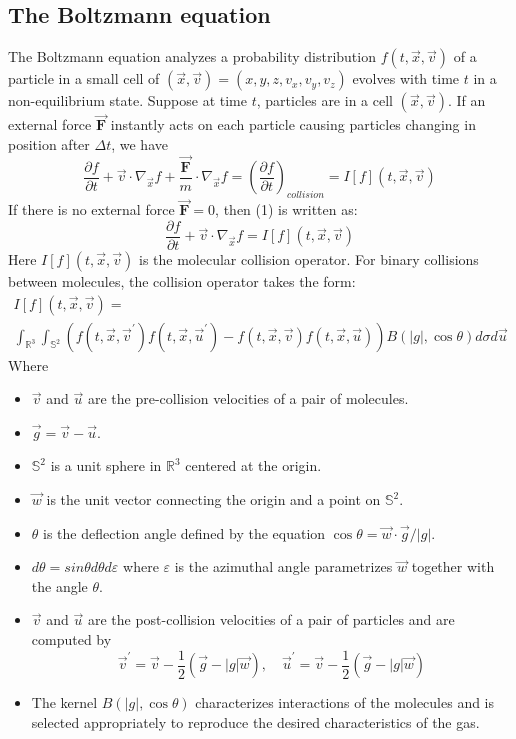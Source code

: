 \documentclass{article}
\begin{document}
\subsection{The Boltzmann equation} \label{BoltzEq}
The Boltzmann equation analyzes a probability distribution $f(t, \vec{x}, \vec{v})$ of a particle in a small cell of $(\vec{x}, \vec{v})=(x,y,z,v_x,v_y,v_z)$ evolves with time $t$ in a non-equilibrium state. Suppose at time $t$, particles are in a cell $(\vec{x},\vec{v})$. If an external force $\vec{\textbf{F}}$ instantly acts on each particle causing particles changing in position after $\Delta t$, we have 
\begin{equation} \label{BoltzEqGeneral}
\frac{\partial f}{\partial t} + \vec{v}\cdot\nabla_{\vec{x}}f + \frac{\vec{\textbf{F}}}{m}\cdot\nabla_{\vec{x}}f = \left(\frac{\partial f}{\partial t}\right)_{collision} = I[f](t,\vec{x},\vec{v})
\end{equation}
If there is no external force $\vec{\textbf{F}} = 0$, then (1) is written as:
\begin{equation} \label{BoltzEqNoForce}
\frac{\partial f}{\partial t} + \vec{v}\cdot\nabla_{\vec{x}}f = I[f](t,\vec{x},\vec{v})
\end{equation}
Here $I[f](t,\vec{x},\vec{v})$ is the molecular collision operator. For binary collisions between molecules, the collision operator takes the form:
\begin{multline} \label{CollOp}
I[f](t,\vec{x},\vec{v}) = \\ \int_{\mathbb{R}^3}\int_{\mathbb{S}^2}(f(t,\vec{x},\vec{v}^\prime)f(t,\vec{x},\vec{u}^\prime) - f(t,\vec{x},\vec{v})f(t,\vec{x},\vec{u}))B(|g|,\cos\theta)d\sigma d\vec{u}
\end{multline}
Where
\begin{itemize}
	\item $\vec{v}$ and $\vec{u}$ are the pre-collision velocities of a pair of molecules.
	\item $\vec{g} = \vec{v} - \vec{u}$.
	\item $\mathbb{S}^2$ is a unit sphere in $\mathbb{R}^3$ centered at the origin.
	\item $\vec{w}$ is the unit vector connecting the origin and a point on $\mathbb{S}^2$.
	\item $\theta$ is the deflection angle defined by the equation $\cos\theta = \vec{w}\cdot\vec{g}/|g|$.
	\item $d\theta = sin\theta d\theta d\varepsilon$ where $\varepsilon$ is the azimuthal angle parametrizes $\vec{w}$ together with the angle $\theta$.
	\item $\vec{v}$ and $\vec{u}$ are the post-collision velocities of a pair of particles and are computed by
	\begin{equation*}
		\vec{v}^\prime = \vec{v} - \frac{1}{2}(\vec{g} - |g|\vec{w}), \quad \vec{u}^\prime = \vec{v} - \frac{1}{2}(\vec{g} - |g|\vec{w})
	\end{equation*}
	\item The kernel $B(|g|,\cos\theta)$ characterizes interactions of the molecules and is selected appropriately to reproduce the desired characteristics of the gas.
\end{itemize}
\end{document}
